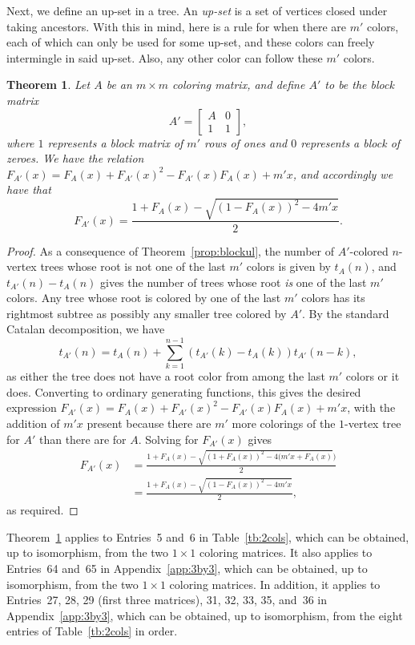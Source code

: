 \documentclass[12pt]{amsart}
\newtheorem{theorem}{Theorem}
\newcommand{\gfll}[1]{F_{#1}(x)}
\newcommand{\gfall}{\gfll{A}}
\begin{document}
Next, we define an up-set in a tree. An \emph{up-set} is a set of vertices closed under taking ancestors. With this in mind,
here is a rule for when there are $m'$ colors, each of which can only be used for some up-set, 
and these colors can freely intermingle in said up-set. Also, any other color can follow these $m'$ colors.
\begin{theorem}\label{prop:upsetonly}
    Let $A$ be an $m\times m$ coloring matrix, and define $A'$ to be the block matrix
    \[
    A'=\left[\begin{array}{c|c}A&0\\\hline1&1\end{array}\right],
    \]
    where $1$ represents a block matrix of $m'$ rows of ones and $0$ represents a block of zeroes.
    We have the relation
    $\gfll{A'}=\gfall+\gfll{A'}^2-\gfll{A'}\gfall+m'x$,
    and accordingly we have that
    \[
    \gfll{A'}=\frac{1+\gfall-\sqrt{(1-\gfall)^2-4m'x}}{2}.
    \]
\end{theorem}
\begin{proof}
    As a consequence of Theorem~\ref{prop:blockul}, the
    number of $A'$-colored $n$-vertex trees whose root is not one of the last $m'$ colors is given by $t_A(n)$, and $t_{A'}(n)-t_A(n)$ gives the number of trees whose root \emph{is} one of the last $m'$ colors. 
    Any tree whose root is colored by one of the last $m'$ colors
    has its rightmost subtree as possibly any smaller tree colored by $A'$. By the standard Catalan decomposition, we have
    \[
    t_{A'}(n)=t_A(n)+\sum_{k=1}^{n-1}(t_{A'}(k)-t_A(k))t_{A'}(n-k),
    \]
    as either the tree does not have a root color from among the last $m'$ colors or it does. Converting to ordinary generating functions, this gives the desired expression $\gfll{A'}=\gfall+\gfll{A'}^2-\gfll{A'}\gfall+m'x$, with the addition of $m'x$ present because there are $m'$ more colorings of the $1$-vertex tree for $A'$ than there are for $A$. Solving for $\gfll{A'}$ gives
    \begin{align*}
    \gfll{A'} &=\frac{1+\gfall-\sqrt{(1+\gfall)^2-4(m'x+\gfall})}{2} \\ &=\frac{1+\gfall-\sqrt{(1-\gfall)^2-4m'x}}{2},
    \end{align*}
    as required.
\end{proof}
Theorem~\ref{prop:upsetonly} applies to Entries~5 and~6 in Table~\ref{tb:2cols}, which can be obtained, up to isomorphism, from the two $1\times1$ coloring matrices. 
It also applies to Entries~64 and~65 in Appendix~\ref{app:3by3}, which can be obtained, up to isomorphism, from the two $1\times 1$ coloring matrices. In addition, it applies to Entries~27, 28, 29 (first three matrices), 31, 32, 33, 35, and~36 in Appendix~\ref{app:3by3}, which can be obtained, up to isomorphism, from the eight entries of Table~\ref{tb:2cols} in order.
\end{document}
